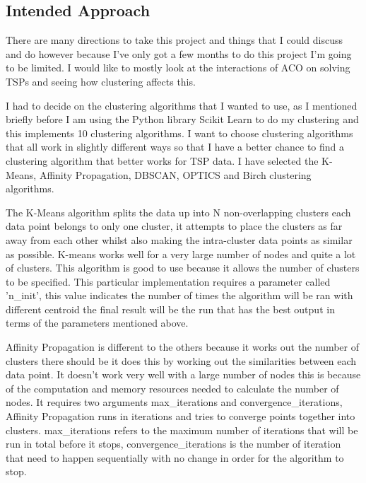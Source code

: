 \subsection{Intended Approach}
There are many directions to take this project and things that I could discuss and do however because I've only got a few months to do this project I'm going to be limited. I would like to mostly look at the interactions of ACO on solving TSPs and seeing how clustering affects this.

I had to decide on the clustering algorithms that I wanted to use, as I mentioned briefly before I am using the Python library Scikit Learn to do my clustering and this implements 10 clustering algorithms. I want to choose clustering algorithms that all work in slightly different ways so that I have a better chance to find a clustering algorithm that better works for TSP data. I have selected the K-Means, Affinity Propagation, DBSCAN, OPTICS and Birch clustering algorithms. 

The K-Means algorithm splits the data up into N non-overlapping clusters each data point belongs to only one cluster, it attempts to place the clusters as far away from each other whilst also making the intra-cluster data points as similar as possible. K-means works well for a very large number of nodes and quite a lot of clusters. This algorithm is good to use because it allows the number of clusters to be specified. This particular implementation requires a parameter called 'n\_init', this value indicates the number of times the algorithm will be ran with different centroid the final result will be the run that has the best output in terms of the parameters mentioned above.

Affinity Propagation is different to the others because it works out the number of clusters there should be it does this by working out the similarities between each data point. It doesn't work very well with a large number of nodes this is because of the computation and memory resources needed to calculate the number of nodes. It requires two arguments max\_iterations and convergence\_iterations, Affinity Propagation runs in iterations and tries to converge points together into clusters. max\_iterations refers to the maximum number of iterations that will be run in total before it stops, convergence\_iterations is the number of iteration that need to happen sequentially with no change in order for the algorithm to stop. 

